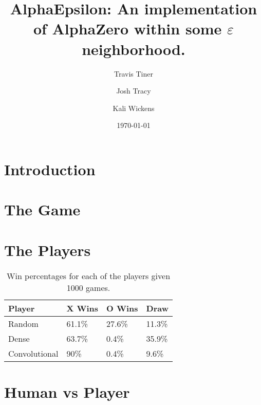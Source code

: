 \documentclass[11pt]{article}
\title{AlphaEpsilon: An implementation of AlphaZero within some $\varepsilon$ neighborhood.}
\author{Travis Tiner}
\author{Josh Tracy}
\author{Kali Wickens}
\affil{University of Utah -- Deep Learning}
\date{\today}
\begin{document}
\maketitle

\section{Introduction}

	

\section{The Game}

	

\section{The Players}

	
	
	

	\begin{table}[]
		\centering
		\begin{tabular}{llll}
		\hline
		\textbf{Player} & \textbf{X Wins} & \textbf{O Wins} & \textbf{Draw} \\ \hline
		Random          & 61.1\%          & 27.6\%          & 11.3\%        \\
		Dense           & 63.7\%          & 0.4\%           & 35.9\%        \\
		Convolutional   & 90\%            & 0.4\%           & 9.6\%         \\ \hline
		\end{tabular}
		\caption{Win percentages for each of the players given 1000 games.}
	\end{table}

	

\section{Human vs Player}

	

%
%
%
%
%
\end{document}
